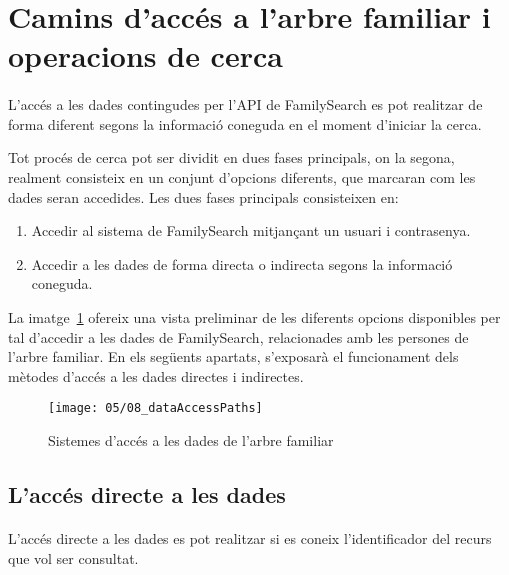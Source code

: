 \section{Camins d'accés a l'arbre familiar i operacions de cerca}

    \paragraph{}
    L'accés a les dades contingudes per l'API de FamilySearch es pot realitzar de forma diferent segons la informació coneguda en el moment d’iniciar la cerca.

    Tot procés de cerca pot ser dividit en dues fases principals, on la segona, realment consisteix en un conjunt d'opcions diferents, que marcaran com les dades seran accedides. Les dues fases principals consisteixen en:

    \begin{enumerate}
        \item Accedir al sistema de FamilySearch mitjançant un usuari i contrasenya.
        \item Accedir a les dades de forma directa o indirecta segons la informació coneguda.
    \end{enumerate}

    La imatge~\ref{fig:dataAcessPath} ofereix una vista preliminar de les diferents opcions disponibles per tal d'accedir a les dades de FamilySearch, relacionades amb les persones de l'arbre familiar. En els següents apartats, s'exposarà el funcionament dels mètodes d'accés a les dades directes i indirectes.

    \begin{figure}[h]
        \texttt{[image: 05/08\_dataAccessPaths]}
        \centering
        \caption{Sistemes d'accés a les dades de l'arbre familiar}\label{fig:dataAcessPath}
    \end{figure}


    \subsection{L'accés directe a les dades}

        \paragraph{}
        L'accés directe a les dades es pot realitzar si es coneix l'identificador del recurs que vol ser consultat.

